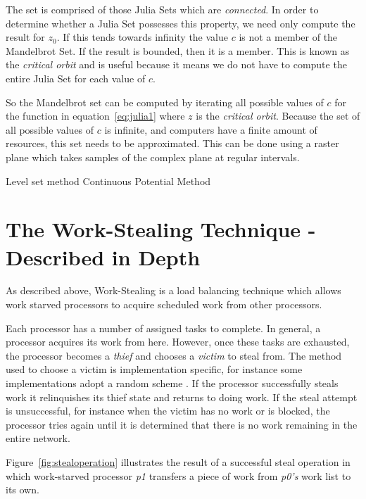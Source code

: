 The set is comprised of those Julia Sets which are \textit{connected}. In order to determine whether a Julia Set possesses this property,
we need only compute the result for \(z_0\). If this tends towards infinity the value \(c\) is not a member of the Mandelbrot Set. If the result
is bounded, then it is a member. This is known as the \textit{critical orbit} and is useful because it means we do not have to compute
the entire Julia Set for each value of \(c\).

So the Mandelbrot set can be computed by iterating all possible values of \(c\) for the function in equation~\ref{eq:julia1} where \(z\) is the \textit{critical
orbit}. Because the set of all possible values of \(c\) is infinite, and computers have a finite amount of resources, this set needs to be approximated. 
This can be done using a raster plane which takes samples of the complex plane at regular intervals. 

Level set method \cite[p.~188]{fractimg} Continuous Potential Method \cite[p.~191]{fractimg}

\section{The Work-Stealing Technique - Described in Depth}

As described above, Work-Stealing is a load balancing technique which allows work starved processors to acquire scheduled work from other processors. 

Each processor has a number of assigned tasks to complete. In general, a processor acquires its work from here.
However, once these tasks are exhausted, the processor becomes a \textit{thief} and chooses a \textit{victim} to steal from. 
The method used to choose a victim is implementation specific, for instance some implementations adopt a random scheme \cite{blumleis , jliff, narora}.
If the processor successfully steals work it relinquishes its thief state and returns to doing work.
If the steal attempt is unsuccessful, for instance when the victim has no work or is blocked, the processor tries again
until it is determined that there is no work remaining in the entire network. 

Figure~\ref{fig:stealoperation} illustrates the result of a successful steal operation in which work-starved processor \textit{p1} transfers a piece
of work from \textit{p0's} work list to its own. %

